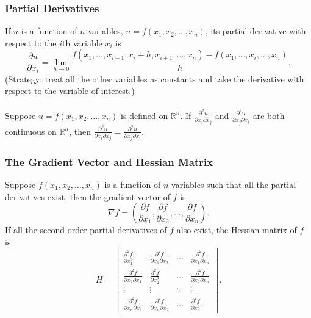 \documentclass{beamer}
\begin{document}
\begin{frame} 
\frametitle{Partial Derivatives}
If $u$ is a function of $n$ variables, $u = f(x_1,x_2,\ldots,x_n)$, its partial derivative with respect to the $i$th variable $x_i$ is
$$
\frac{\partial u}{\partial x_i} = \lim_{h \rightarrow 0} \frac{f(x_1,\ldots,x_{i-1},x_i+h,x_{i+1},\ldots,x_n)-f(x_1,\ldots,x_i,\ldots,x_n)}{h}.
$$
(Strategy: treat all the other variables as constants and take the derivative with respect to the variable of interest.)
\\~\\
Suppose $u = f(x_1,x_2,\ldots,x_n)$ is defined on $\mathbb{R}^n$. If $\frac{\partial^2 u}{\partial x_i\partial x_j}$ and $\frac{\partial^2 u}{\partial x_j\partial x_i}$ are both continuous on $\mathbb{R}^n$, then $\frac{\partial^2 u}{\partial x_i\partial x_j} = \frac{\partial^2 u}{\partial x_j\partial x_i}$.
\end{frame}

\begin{frame} 
\frametitle{The Gradient Vector and Hessian Matrix}
Suppose $f(x_1,x_2,\ldots,x_n)$ is a function of $n$ variables such that all the partial derivatives exist, then the gradient vector of $f$ is
$$
\nabla f = \left(\frac{\partial f}{\partial x_1},\frac{\partial f}{\partial x_2}, \ldots,\frac{\partial f}{\partial x_n}\right).
$$
If all the second-order partial derivatives of $f$ also exist, the Hessian matrix of $f$ is
$$
H = 
\begin{bmatrix}
    \frac{\partial^2 f}{\partial x_1^2} & \frac{\partial^2 f}{\partial x_1\partial x_2} &  \dots  & \frac{\partial^2 f}{\partial x_1\partial x_n} \\
    \frac{\partial^2 f}{\partial x_2\partial x_1} & \frac{\partial^2 f}{\partial x_2^2} &  \dots  & \frac{\partial^2 f}{\partial x_2\partial x_n}\\
    \vdots & \vdots &  \ddots & \vdots \\
    \frac{\partial^2 f}{\partial x_n\partial x_1} & \frac{\partial^2 f}{\partial x_n\partial x_2} &  \dots  & \frac{\partial^2 f}{\partial x_n^2}
\end{bmatrix}.
$$
\end{frame}
\end{document}
